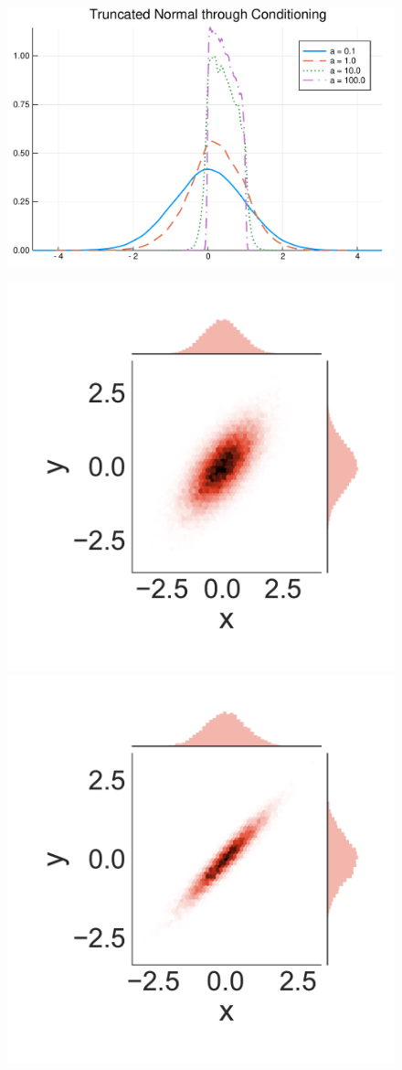 \begin{figure}[!htb]
\centering
\begin{minipage}{0.45\linewidth}
\includegraphics[width=\linewidth]{figures/truncated}
\end{minipage}%
\begin{minipage}{0.45\linewidth}
	\includegraphics[width=.45\linewidth, trim={1.7cm, 1.6cm, 1.3cm, 1.5cm}, clip]{figures/1-0}
	\includegraphics[width=.45\linewidth, trim={1.7cm, 1.6cm, 1.3cm, 1.5cm}, clip]{figures/10-0}
	

\end{minipage}
\end{figure}
